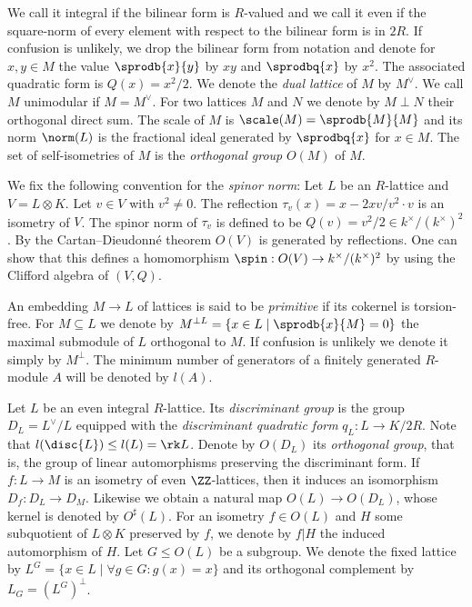 We call it integral if the bilinear form is $R$-valued and we call it even if the square-norm of every element with respect to the bilinear form is in $2 R$. 
If confusion is unlikely, we drop the bilinear form from notation and denote for $x,y \in M$ the value
$\sprodb{x}{y}$ by $xy$ and $\sprodbq{x}$ by $x^2$.
The associated quadratic form is $Q(x) = x^2/2$.
We denote the \emph{dual lattice} of $M$ by $M^\vee$. We call $M$ unimodular if $M=M^\vee$.
For two lattices $M$ and $N$ we denote by $M\perp N$ their orthogonal direct sum.
The scale of $M$ is $\scale(M)=\sprodb{M}{M}$
and its norm $\norm(L)$
is the fractional ideal generated by $\sprodbq{x}$ for $x \in M$.
The set of self-isometries of $M$ is the \emph{orthogonal group} $O(M)$ of $M$.

We fix the following convention for the \emph{spinor norm}: Let $L$ be an $R$-lattice and $V = L \otimes K$. Let $v \in V$ with $v^2 \neq 0$. The reflection $\tau_v(x) = x - 2xv/v^2\cdot v$ is an isometry of $V$.
The spinor norm of $\tau_v$ is defined to be $Q(v)=v^2/2 \in k^\times/(k^\times)^2$.
By the Cartan--Dieudonn\'e theorem $O(V)$ is generated by reflections.
One can show that this defines a homomorphism $\spin: O(V) \to k^\times/(k^\times)^2$ by using the Clifford algebra of $(V,Q)$.

An embedding $M \to L$ of lattices is said to be \emph{primitive} if its cokernel is torsion-free. For $M\subseteq L$ we denote by $M^{\perp L}=\{x \in L \mid \sprodb{x}{M}=0\}$ the maximal submodule of $L$ orthogonal to $M$. If confusion is unlikely we denote it simply by $M^\perp$.
The minimum number of generators of a finitely generated $R$-module $A$ will be denoted by $l(A)$.

Let $L$ be an even integral $R$-lattice. Its \emph{discriminant group} is the group $D_L = L^\vee/ L$ equipped with the \emph{discriminant quadratic form}
$q_L\colon L \to K/2 R$.
Note that $l(\disc{L})\leq l(L)=\rk L$.
Denote by $O(D_L)$ its \emph{orthogonal group}, that is, the group of linear automorphisms preserving the discriminant form.
If $f \colon L \to M$ is an isometry of even $\ZZ$-lattices, then it induces an isomorphism $D_f \colon D_L \to D_M$.
Likewise we obtain a natural map $O(L) \to O(D_L)$, whose kernel is denoted by $O^\sharp(L)$. For an isometry $f \in O(L)$ and $H$ some subquotient of $L \otimes K$ preserved by $f$, we denote by $f|H$ the induced automorphism of $H$.
Let $G\leq O(L)$ be a subgroup. We denote the fixed lattice by $L^G=\{x \in L \mid \forall g \in G \colon g(x)=x \}$ and its orthogonal complement by $L_G=(L^G)^\perp$.

